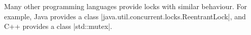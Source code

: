 Many other programming languages provide locks with similar behaviour.  For
example, Java provides a class |java.util.concurrent.locks.ReentrantLock|, and
C++ provides a class |std::mutex|.



\exercises









